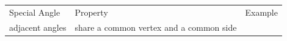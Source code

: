{    %
    
        \begin{center}
      
      \label{m39370*id315548}
      
    \noindent
      \tablelasttail{}
      \begin{xtabular*}{\mytablewidth}[t]{|p{10\mystarwidth}|p{10\mystarwidth}|p{10\mystarwidth}|}\hline
    
    
        Special Angle &
    
    
        Property &
    
    
        Example%
     \tabularnewline{}
    
    
        adjacent angles &
    
    
        share a common vertex and a common side &
    
    

\end{xtabular*}
\end{center}}
